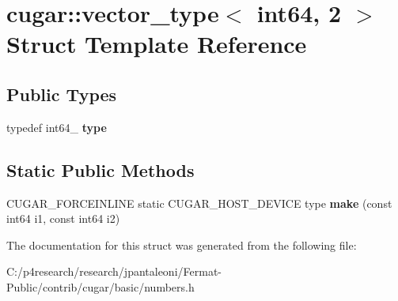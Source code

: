 \hypertarget{structcugar_1_1vector__type_3_01int64_00_012_01_4}{}\section{cugar\+:\+:vector\+\_\+type$<$ int64, 2 $>$ Struct Template Reference}
\label{structcugar_1_1vector__type_3_01int64_00_012_01_4}
\subsection*{Public Types}
\begin{DoxyCompactItemize}
\item 
\mbox{\label{structcugar_1_1vector__type_3_01int64_00_012_01_4_a2663303210e61dc922091a345f9be8a1}} 
typedef int64\+\_ {\bfseries type}
\end{DoxyCompactItemize}
\subsection*{Static Public Methods}
\begin{DoxyCompactItemize}
\item 
\mbox{\label{structcugar_1_1vector__type_3_01int64_00_012_01_4_a3dac90dde4924c14f101c8c0e47ebbd4}} 
C\+U\+G\+A\+R\+\_\+\+F\+O\+R\+C\+E\+I\+N\+L\+I\+NE static C\+U\+G\+A\+R\+\_\+\+H\+O\+S\+T\+\_\+\+D\+E\+V\+I\+CE type {\bfseries make} (const int64 i1, const int64 i2)
\end{DoxyCompactItemize}


The documentation for this struct was generated from the following file\+:\begin{DoxyCompactItemize}
\item 
C\+:/p4research/research/jpantaleoni/\+Fermat-\/\+Public/contrib/cugar/basic/numbers.\+h\end{DoxyCompactItemize}
